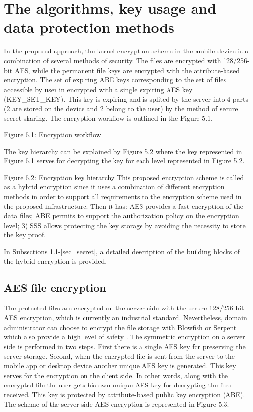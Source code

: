 \documentclass[twocolumn]{svjour3}          %
\begin{document}
\section{The algorithms, key usage and data protection methods}
\label{sec_algorithms}
In the proposed approach, the kernel encryption scheme in the mobile device is a combination of several methods of security. The files are encrypted with 128/256-bit AES, while the permanent file keys are encrypted with the attribute-based encryption. The set of expiring ABE keys corresponding to the set of files accessible by user in encrypted with a single expiring AES key (KEY\_SET\_KEY). This key is expiring and is splited by the server into 4 parts (2 are stored on the device and 2 belong to the user) by the method of secure secret sharing. The encryption workflow is outlined in the Figure 5.1.

Figure 5.1: Encryption workflow

The key hierarchy can be explained by Figure 5.2 where the key represented in Figure 5.1 serves for decrypting the key for each level represented in Figure 5.2.

Figure 5.2: Encryption key hierarchy
This proposed encryption scheme is called as a hybrid encryption since it uses a combination of different encryption methods in order to support all requirements to the encryption scheme used in the proposed infrastructure. Then it has:
AES provides a fast encryption of the data files;
ABE permits to support the authorization policy on the encryption level;
3)  SSS allows protecting the key storage by avoiding the necessity to store the key proof.

In Subsections \ref{sec_aes}-\ref{sec_secret}, a detailed description of the building blocks of the hybrid encryption is provided.

\subsection{AES file encryption }
\label{sec_aes}
The protected files are encrypted on the server side with the secure 128/256 bit AES encryption, which is currently an industrial standard. Nevertheless, domain administrator can choose to encrypt the file storage with Blowfish or Serpent which also provide a high level of safety \cite{nist2000}. The symmetric encryption on a server side is performed in two steps. First there is a single AES key for preserving the server storage. Second, when the encrypted file is sent from the server to the mobile app or desktop device another unique AES key is generated. This key serves for the encryption on the client side. In other words, along with the encrypted file the user gets his own unique AES key for decrypting the files received. This key is protected by attribute-based public key encryption (ABE). The scheme of the server-side AES encryption is represented in Figure 5.3.
\end{document}
